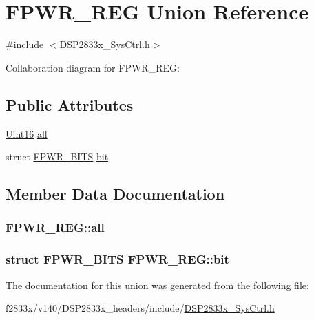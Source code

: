 \hypertarget{union_f_p_w_r___r_e_g}{}\section{F\+P\+W\+R\+\_\+\+R\+E\+G Union Reference}
\label{union_f_p_w_r___r_e_g}


{\ttfamily \#include $<$D\+S\+P2833x\+\_\+\+Sys\+Ctrl.\+h$>$}



Collaboration diagram for F\+P\+W\+R\+\_\+\+R\+E\+G\+:
\subsection*{Public Attributes}
\begin{DoxyCompactItemize}
\item 
\hyperlink{_d_s_p2833x___device_8h_a59a9f6be4562c327cbfb4f7e8e18f08b}{Uint16} \hyperlink{union_f_p_w_r___r_e_g_a1dbac8f10a721593bfed4c7d48168e80}{all}
\item 
struct \hyperlink{struct_f_p_w_r___b_i_t_s}{F\+P\+W\+R\+\_\+\+B\+I\+T\+S} \hyperlink{union_f_p_w_r___r_e_g_a4b6679e9ad0a5c691aeb596d27bf933f}{bit}
\end{DoxyCompactItemize}


\subsection{Member Data Documentation}
\hypertarget{union_f_p_w_r___r_e_g_a1dbac8f10a721593bfed4c7d48168e80}{}
\subsubsection[{all}]{ F\+P\+W\+R\+\_\+\+R\+E\+G\+::all}\label{union_f_p_w_r___r_e_g_a1dbac8f10a721593bfed4c7d48168e80}
\hypertarget{union_f_p_w_r___r_e_g_a4b6679e9ad0a5c691aeb596d27bf933f}{}
\subsubsection[{bit}]{\setlength{\rightskip}{0pt plus 5cm}struct {\bf F\+P\+W\+R\+\_\+\+B\+I\+T\+S} F\+P\+W\+R\+\_\+\+R\+E\+G\+::bit}\label{union_f_p_w_r___r_e_g_a4b6679e9ad0a5c691aeb596d27bf933f}


The documentation for this union was generated from the following file\+:\begin{DoxyCompactItemize}
\item 
f2833x/v140/\+D\+S\+P2833x\+\_\+headers/include/\hyperlink{_d_s_p2833x___sys_ctrl_8h}{D\+S\+P2833x\+\_\+\+Sys\+Ctrl.\+h}\end{DoxyCompactItemize}

